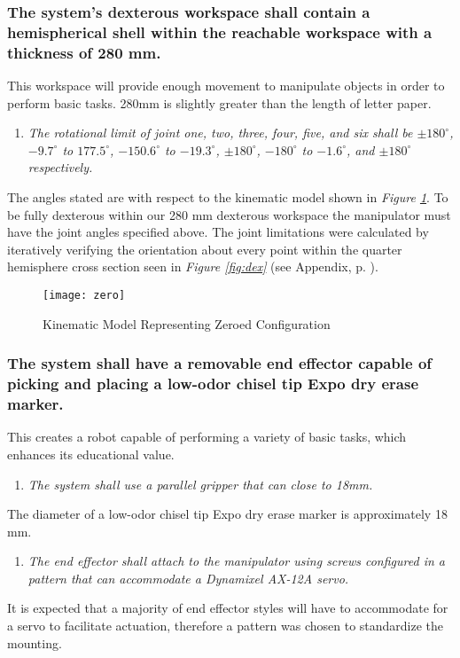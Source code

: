\subsubsection{The system’s dexterous workspace shall contain a hemispherical shell within the reachable workspace with a thickness of 280 mm.}\label{sec:zero}
This workspace will provide enough movement to manipulate objects in order to perform basic tasks. 280mm is slightly greater than the length of letter paper.
\begin{enumerate}
  \item \textit{The rotational limit of joint one, two, three, four, five, and six shall be \(\pm180^{\circ}\), \(-9.7^{\circ}\) to \(177.5^{\circ}\), \(-150.6^{\circ}\) to \(-19.3^{\circ}\), \(\pm180^{\circ}\), \(-180^{\circ}\) to \(-1.6^{\circ}\), and \(\pm180^{\circ}\) respectively.}
\end{enumerate}
The angles stated are with respect to the kinematic model shown in \emph{Figure \ref{fig:zero}}. To be fully dexterous within our 280 mm dexterous workspace the manipulator must have the joint angles specified above. The joint limitations were calculated by iteratively verifying the orientation about every point within the quarter hemisphere cross section seen in \emph{Figure \ref{fig:dex}} (see Appendix, p. \pageref{sec:app}).
  \begin{figure}[htp]
    \centering
    \texttt{[image: zero]}
    \caption[Kinematic Model Representing Zeroed Configuration]{Kinematic Model Representing Zeroed Configuration \cite{robo}}
    \label{fig:zero}
  \end{figure}
\subsubsection{The system shall have a removable end effector capable of picking and placing a low-odor chisel tip Expo dry erase marker.}
This creates a robot capable of performing a variety of basic tasks, which enhances its educational value.
\begin{enumerate}
  \item \textit{The system shall use a parallel gripper that can close to 18mm.}
\end{enumerate}
The diameter of a low-odor chisel tip Expo dry erase marker is approximately 18 mm.
\begin{enumerate}[resume]
  \item \textit{The end effector shall attach to the manipulator using screws configured in a pattern that can accommodate a Dynamixel AX-12A servo.}
\end{enumerate}
It is expected that a majority of end effector styles will have to accommodate for a servo to facilitate actuation, therefore a pattern was chosen to standardize the mounting.


